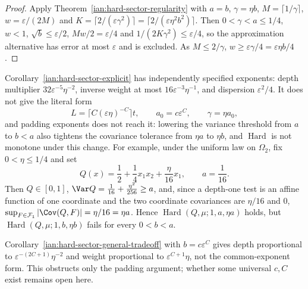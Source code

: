 \begin{proof}
Apply Theorem~\ref{ian:hard-sector-regularity} with \(a=b\),
\(\gamma=\eta b\), \(M=\lceil1/\gamma\rceil\), \(w=\varepsilon/(2M)\) and
\(K=\lceil2/(\varepsilon\gamma^2)\rceil=\lceil2/(\varepsilon\eta^2b^2)\rceil\).
Then \(0<\gamma<a\le1/4\), \(w<1\), \(\sqrt b\le\varepsilon/2\),
\(Mw/2=\varepsilon/4\) and \(1/(2K\gamma^2)\le\varepsilon/4\), so the
approximation alternative has error at most \(\varepsilon\) and is
excluded. As \(M\le2/\gamma\),
\(w\ge\varepsilon\gamma/4=\varepsilon\eta b/4\).
\end{proof}

\begin{remark}
\label{ian:hard-sector-common-exponent-warning}
Corollary~\ref{ian:hard-sector-explicit} has independently specified
exponents: depth multiplier \(32\varepsilon^{-5}\eta^{-2}\), inverse
weight at most \(16\varepsilon^{-3}\eta^{-1}\), and dispersion
\(\varepsilon^2/4\). It does not give the literal form
\[
 L=\lceil C(\varepsilon\eta)^{-C}\rceil t,\qquad
 a_0=c\varepsilon^C,\qquad
 \gamma=\eta a_0,
\]
and padding exponents does not reach it: lowering the variance threshold
from \(a\) to \(b<a\) also tightens the covariance tolerance from
\(\eta a\) to \(\eta b\), and \(\operatorname{Hard}\) is not monotone
under this change. For example, under the uniform law on \(\Omega_2\),
fix \(0<\eta\le1/4\) and set
\[
 Q(x)=\frac12+\frac14x_1x_2+\frac{\eta}{16}x_1,
 \qquad a=\frac1{16}.
\]
Then \(Q\in[0,1]\), \(\Var Q=\frac1{16}+\frac{\eta^2}{256}\ge a\), and,
since a depth-one test is an affine function of one coordinate and the
two coordinate covariances are \(\eta/16\) and \(0\),
\(\sup_{F\in\mathcal F_1}|\Cov(Q,F)|=\eta/16=\eta a\).
Hence \(\operatorname{Hard}(Q,\mu;1,a,\eta a)\) holds, but
\(\operatorname{Hard}(Q,\mu;1,b,\eta b)\) fails for every \(0<b<a\).

Corollary~\ref{ian:hard-sector-general-tradeoff} with
\(b=c\varepsilon^C\) gives depth proportional to
\(\varepsilon^{-(2C+1)}\eta^{-2}\) and weight proportional to
\(\varepsilon^{C+1}\eta\), not the common-exponent form.
This obstructs only the padding argument; whether some universal
\(c,C\) exist remains open here.
\end{remark}

